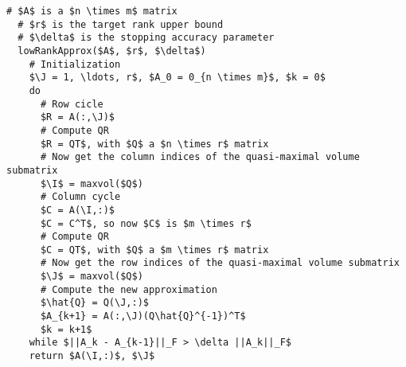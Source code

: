 \begin{lstlisting}[float, caption=Low-rank approximation algorithm, label=algo:cross-approx, title=Low-rank approximation algorithm]
  # $A$ is a $n \times m$ matrix
  # $r$ is the target rank upper bound
  # $\delta$ is the stopping accuracy parameter
  lowRankApprox($A$, $r$, $\delta$)
    # Initialization
    $\J = 1, \ldots, r$, $A_0 = 0_{n \times m}$, $k = 0$
    do
      # Row cicle
      $R = A(:,\J)$
      # Compute QR
      $R = QT$, with $Q$ a $n \times r$ matrix
      # Now get the column indices of the quasi-maximal volume submatrix
      $\I$ = maxvol($Q$)
      # Column cycle
      $C = A(\I,:)$
      $C = C^T$, so now $C$ is $m \times r$
      # Compute QR
      $C = QT$, with $Q$ a $m \times r$ matrix
      # Now get the row indices of the quasi-maximal volume submatrix
      $\J$ = maxvol($Q$)
      # Compute the new approximation
      $\hat{Q} = Q(\J,:)$
      $A_{k+1} = A(:,\J)(Q\hat{Q}^{-1})^T$
      $k = k+1$
    while $||A_k - A_{k-1}||_F > \delta ||A_k||_F$
    return $A(\I,:)$, $\J$
\end{lstlisting}

